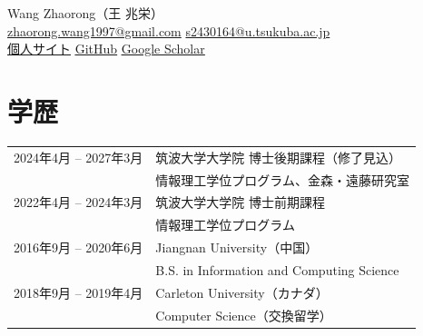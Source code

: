\documentclass[a4paper,11pt]{article}
\newcommand{\link}[2]{\href{#1}{\underline{#2}}}
\begin{document}
\begin{center}
{\headingfont\LARGE Wang Zhaorong（王 兆栄）}\\[4pt]
\href{mailto:zhaorong.wang1997@gmail.com}{zhaorong.wang1997@gmail.com}\qquad
\href{mailto:s2430164@u.tsukuba.ac.jp}{s2430164@u.tsukuba.ac.jp}\\[3pt]
\link{https://larsph.github.io/}{個人サイト}\qquad
\link{https://github.com/LarsPh}{GitHub}\qquad
\link{https://scholar.google.com/citations?user=3numV2UAAAAJ}{Google Scholar}
\end{center}
\section{学歴}
\begin{tabularx}{\textwidth}{@{}p{53mm}X@{}}
2024年4月 -- 2027年3月 & 筑波大学大学院 博士後期課程（修了見込）\\
 & 情報理工学位プログラム、金森・遠藤研究室\\
2022年4月 -- 2024年3月 & 筑波大学大学院 博士前期課程\\
 & 情報理工学位プログラム\\
2016年9月 -- 2020年6月 & Jiangnan University（中国）\\
 & B.S. in Information and Computing Science\\
2018年9月 -- 2019年4月 & Carleton University（カナダ）\\
 & Computer Science（交換留学）
\end{tabularx}
\end{document}

